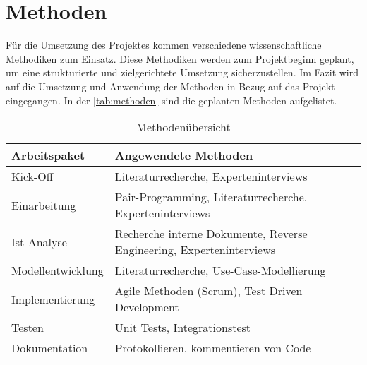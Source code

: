 \chapter{Methoden}
Für die Umsetzung des Projektes kommen verschiedene wissenschaftliche Methodiken zum Einsatz. Diese Methodiken werden
zum Projektbeginn geplant, um eine strukturierte und zielgerichtete Umsetzung sicherzustellen. Im Fazit wird auf die 
Umsetzung und Anwendung der Methoden in Bezug auf das Projekt eingegangen. In der \autoref{tab:methoden} sind die 
geplanten Methoden aufgelistet.

\begin{table}[H]                                
    \centering
    \caption{Methodenübersicht}
    \begin{tabular}{|l|l|} \hline
        \textbf{Arbeitspaket}   & \textbf{Angewendete Methoden}                                         \\ \hline
        Kick-Off                & Literaturrecherche, Experteninterviews                                \\ \hline
        Einarbeitung            & Pair-Programming, Literaturrecherche, Experteninterviews              \\ \hline  
        Ist-Analyse             & Recherche interne Dokumente, Reverse Engineering, Experteninterviews  \\ \hline
        Modellentwicklung       & Literaturrecherche, Use-Case-Modellierung                             \\ \hline 
        Implementierung         & Agile Methoden (Scrum), Test Driven Development                       \\ \hline
        Testen                  & Unit Tests, Integrationstest                                          \\ \hline
        Dokumentation           & Protokollieren, kommentieren von Code                                 \\ \hline
    \end{tabular}
    \label{tab:methoden}
\end{table}
